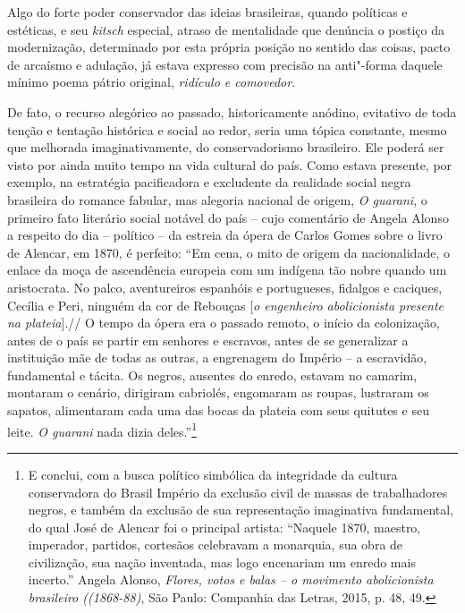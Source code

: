 Algo do forte poder conservador das ideias brasileiras, quando políticas
e estéticas, e seu \emph{kitsch} especial, atraso de mentalidade que
denúncia o postiço da modernização, determinado por esta própria posição
no sentido das coisas, pacto de arcaísmo e adulação, já estava expresso
com precisão na anti"-forma daquele mínimo poema pátrio original,
\emph{ridículo e comovedor}.

De fato, o recurso alegórico ao passado, historicamente anódino,
evitativo de toda tenção e tentação histórica e social ao redor, seria
uma tópica constante, mesmo que melhorada imaginativamente, do
conservadorismo brasileiro. Ele poderá ser visto por ainda muito tempo
na vida cultural do país. Como estava presente, por exemplo, na
estratégia pacificadora e excludente da realidade social negra
brasileira do romance fabular, mas alegoria nacional de origem, \emph{O
guarani}, o primeiro fato literário social notável do país -- cujo
comentário de Angela Alonso a respeito do dia -- político -- da estreia
da ópera de Carlos Gomes sobre o livro de Alencar, em 1870, é perfeito:
``Em cena, o mito de origem da nacionalidade, o enlace da moça de
ascendência europeia com um indígena tão nobre quando um aristocrata. No
palco, aventureiros espanhóis e portugueses, fidalgos e caciques,
Cecília e Peri, ninguém da cor de Rebouças {[}\emph{o engenheiro
abolicionista presente na plateia}{]}.// O tempo da ópera era o passado
remoto, o início da colonização, antes de o país se partir em senhores e
escravos, antes de se generalizar a instituição mãe de todas as outras,
a engrenagem do Império -- a escravidão, fundamental e tácita. Os
negros, ausentes do enredo, estavam no camarim, montaram o cenário,
dirigiram cabriolés, engomaram as roupas, lustraram os sapatos,
alimentaram cada uma das bocas da plateia com seus quitutes e seu leite.
\emph{O guarani} nada dizia deles.''\footnote{E conclui, com a busca
  político simbólica da integridade da cultura conservadora do Brasil
  Império da exclusão civil de massas de trabalhadores negros, e também
  da exclusão de sua representação imaginativa fundamental, do qual José
  de Alencar foi o principal artista: ``Naquele 1870, maestro,
  imperador, partidos, cortesãos celebravam a monarquia, sua obra de
  civilização, sua nação inventada, mas logo encenariam um enredo mais
  incerto.'' Angela Alonso, \emph{Flores, votos e balas -- o movimento
  abolicionista brasileiro ((1868-88)}, São Paulo: Companhia das Letras,
  2015, p. 48, 49.}


